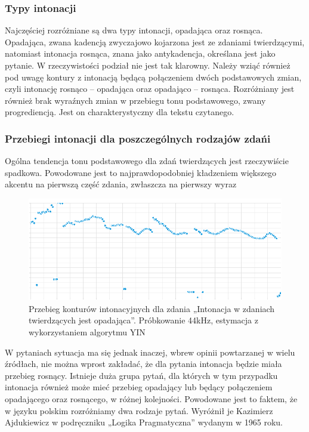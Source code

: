 \documentclass[a4paper,12 pt]{article}
\begin{document}
\subsubsection{Typy intonacji}
Najczęściej rozróżniane są dwa typy intonacji, opadająca oraz rosnąca. Opadająca, zwana kadencją zwyczajowo kojarzona jest ze zdaniami twierdzącymi, natomiast intonacja rosnąca, znana jako antykadencja, określana jest jako pytanie. W rzeczywistości podział nie jest tak klarowny. Należy wziąć również pod uwagę kontury z intonacją będącą połączeniem dwóch podstawowych zmian, czyli intonację rosnąco – opadająca oraz opadająco – rosnąca. Rozróżniany jest również brak wyraźnych zmian w przebiegu tonu podstawowego, zwany progrediencją. Jest on charakterystyczny dla tekstu czytanego.

\subsubsection{Przebiegi intonacji dla poszczególnych rodzajów zdańi}
Ogólna tendencja tonu podstawowego dla zdań twierdzących jest rzeczywiście spadkowa. Powodowane jest to najprawdopodobniej kładzeniem większego akcentu na pierwszą część zdania, zwłaszcza na pierwszy wyraz
\begin{figure}[h]
\centering
\includegraphics[scale=0.7]{zdanie_twierdzace.png}
\caption{Przebieg konturów intonacyjnych dla zdania „Intonacja w zdaniach twierdzących jest opadająca”. Próbkowanie 44kHz, estymacja z wykorzystaniem algorytmu YIN}
\end{figure}
\FloatBarrier
W pytaniach sytuacja ma się jednak inaczej, wbrew opinii powtarzanej w wielu źródłach, nie można wprost zakładać, że dla pytania intonacja będzie miała przebieg rosnący. Istnieje duża grupa pytań, dla których w tym przypadku intonacja również może mieć przebieg opadający lub będący połączeniem opadającego oraz rosnącego, w różnej kolejności. Powodowane jest to faktem, że w języku polskim rozróżniamy dwa rodzaje pytań. Wyróżnił je Kazimierz Ajdukiewicz w podręczniku „Logika Pragmatyczna” wydanym w 1965 roku.
\end{document}
